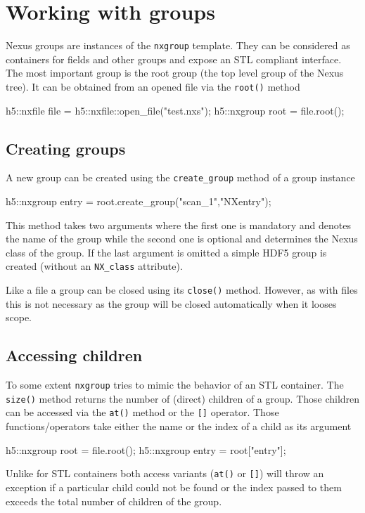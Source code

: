 \section{Working with groups}

Nexus groups are instances of the {\tt nxgroup} template. They can be considered
as containers for fields and other groups and expose an STL compliant interface. 
The most important group is the root group (the top level group of the Nexus
tree). It can be obtained from an opened file via the {\tt root()} method
\begin{cppcode}
h5::nxfile file = h5::nxfile::open_file("test.nxs");
h5::nxgroup root = file.root();
\end{cppcode}

\subsection{Creating groups}

A new group can be created using the {\tt create\_group} method of a group
instance
\begin{cppcode}
h5::nxgroup entry = root.create_group("scan_1","NXentry");
\end{cppcode}
This method takes two arguments where the first one is mandatory and denotes the
name of the group while the second one is optional and determines the Nexus
class of the group. If the last argument is omitted a simple HDF5 group is
created (without an {\tt NX\_class}  attribute).

Like a file a group can be closed using its {\tt close()} method. However, as
with files this is not necessary as the group will be closed automatically when
it looses scope.

\subsection{Accessing children}

To some extent {\tt nxgroup} tries to mimic the behavior of an STL container. 
The {\tt size()} method returns the number of (direct) children of a group. 
Those children can be accessed via the {\tt at()} method or the
{\tt []} operator. Those functions/operators take either the name or the index 
of a child as its argument
\begin{cppcode}
h5::nxgroup root = file.root();
h5::nxgroup entry = root["entry"];
\end{cppcode}
Unlike for STL containers both access variants ({\tt at()} or {\tt []}) will 
throw an exception if a particular child could not be found or the index passed
to them exceeds the total number of children of the group.

